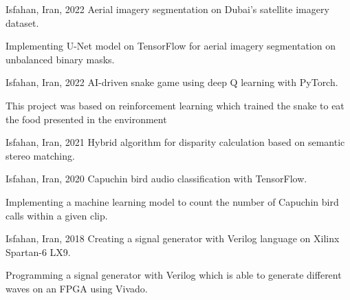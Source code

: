 \begin{cventries}

\cventry
    {Isfahan, Iran, 2022} %
    {Aerial imagery segmentation on Dubai's satellite imagery dataset.} %
    {} %
    {} %
    {
      \begin{cvitems} %
        \item {Implementing U-Net model on TensorFlow for aerial imagery segmentation on unbalanced binary masks.}
      \end{cvitems}
    }

  \cventry
    {Isfahan, Iran, 2022} %
    {AI-driven snake game using deep Q learning with PyTorch.} %
    {} %
    {} %
    {
      \begin{cvitems} %
        \item {This project was based on reinforcement learning which trained the snake to eat the food presented in the environment}
      \end{cvitems}
    }
  \cventry
    {Isfahan, Iran, 2021} %
    {Hybrid algorithm for disparity calculation based on semantic stereo matching.} %
    {} %
    {} %
    {
    }


\cventry
    {Isfahan, Iran, 2020} %
    {Capuchin bird audio classification with TensorFlow.} %
    {} %
    {} %
    {
      \begin{cvitems} %
        \item {Implementing a machine learning model to count the number of Capuchin bird calls within a given clip. }
      \end{cvitems}
    }





  \cventry
    {Isfahan, Iran, 2018} %
    {Creating a signal generator with Verilog language on Xilinx Spartan-6 LX9.} %
    {} %
    {} %
    {
      \begin{cvitems} %
        \item {Programming a signal generator with Verilog which is able to generate different waves on an FPGA using Vivado.}
      \end{cvitems}
    }


\end{cventries}
